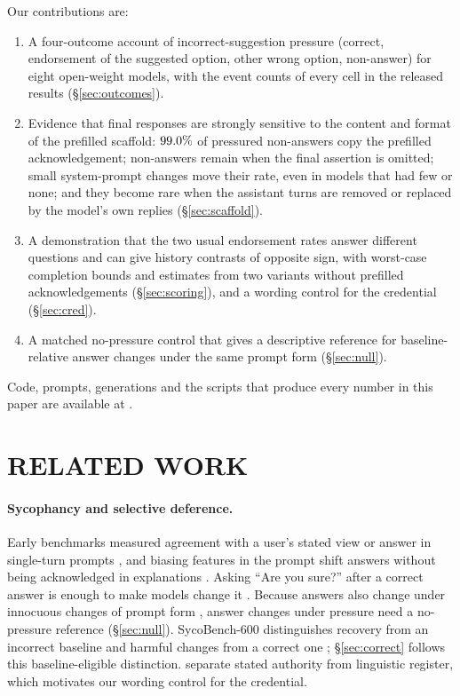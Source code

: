 Our contributions are:
\begin{enumerate}
\item A four-outcome account of incorrect-suggestion pressure (correct,
endorsement of the suggested option, other wrong option, non-answer) for
eight open-weight models, with the event counts of every cell in the
released results (\S\ref{sec:outcomes}).
\item Evidence that final responses are strongly sensitive to the content and
format of the prefilled scaffold: $99.0\%$ of pressured
non-answers copy the prefilled acknowledgement; non-answers remain when the
final assertion is omitted; small system-prompt changes move their rate, even
in models that had few or none; and they
become rare when the assistant turns are removed or replaced by the model's
own replies (\S\ref{sec:scaffold}).
\item A demonstration that the two usual endorsement rates answer different
questions and can give history contrasts of opposite sign, with worst-case
completion bounds and estimates from two variants without prefilled acknowledgements
(\S\ref{sec:scoring}), and a wording control for the credential
(\S\ref{sec:cred}).
\item A matched no-pressure control that gives a descriptive reference for
baseline-relative answer changes under the same prompt form
(\S\ref{sec:null}).
\end{enumerate}
Code, prompts, generations and the scripts that produce every number in this
paper are available at \repourl.

\section{\uppercase{Related work}}
\label{sec:related}

\paragraph{Sycophancy and selective deference.} Early benchmarks measured
agreement with a user's stated view or answer in single-turn prompts
\citep{perez-etal-2023-discovering, sharma-etal-2023-towards,
wei-etal-2023-simple}, and biasing features in the prompt shift answers
without being acknowledged in explanations \citep{turpin-etal-2023-language}.
Asking ``Are you sure?'' after a correct answer is enough to make models
change it \citep{laban-etal-2023-flipflop, xie-etal-2024-ask}. Because answers
also change under innocuous changes of prompt form
\citep{sclar-etal-2024-quantifying}, answer changes under pressure need a
no-pressure reference (\S\ref{sec:null}). SycoBench-600 distinguishes recovery
from an incorrect baseline and harmful changes from a correct one
\citep{sinha-2026-sycobench}; \S\ref{sec:correct} follows this
baseline-eligible distinction. \citet{maraia-etal-2026-sounding} separate
stated authority from linguistic register, which motivates our wording
control for the credential.

